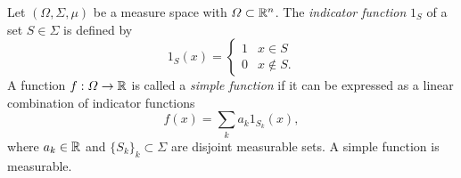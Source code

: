\begin{definition}
    Let $(\Omega,\Sigma,\mu)$ be a measure space with $\Omega\subset\mathbb{R}^n$. The \emph{indicator function} $1_S$ of a set $S\in\Sigma$ is defined by 
    \begin{equation*}
        1_S(x) = \begin{cases}
            1 & x\in S\\
            0 & x\notin S.
        \end{cases}
    \end{equation*}
    A function $f:\Omega\to \mathbb{R}$ is called a \emph{simple function} if it can be expressed as a linear combination of indicator functions 
    \begin{equation}\label{def:simple-functions}
        f(x) = \sum_k a_k 1_{S_k}(x),
    \end{equation}
    where $a_k\in\mathbb{R}$ and $\{S_k\}_k\subset \Sigma$ are disjoint measurable sets. A simple function is measurable. 
\end{definition}
